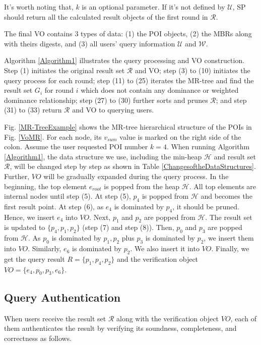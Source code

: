\documentclass[10pt, conference, compsocconf]{IEEEtran}
\begin{document}
It's worth noting that, $k$ is an optional parameter. If it's not defined by $\mathcal{U}$, SP should return all the calculated result objects of the first round in $\mathcal{R}$.

The final VO contains 3 types of data: (1) the POI objects, (2) the MBRs along with theirs digests, and (3) all users' query information $\mathcal{U}$ and $\mathcal{W}$.

Algorithm \ref{Algorithm1} illustrates the query processing and VO construction. Step (1) initiates the original result set $\mathcal{R}$ and VO; step (3) to (10) initiates the query process for each round; step (11) to (25) iterates the MR-tree and find the result set $G_i$ for round $i$ which does not contain any dominance or weighted dominance relationship; step (27) to (30) further sorts and prunes $\mathcal{R}$; and step (31) to (33) return $\mathcal{R}$ and VO to querying users.

Fig. \ref{MR-TreeExample} shows the MR-tree hierarchical structure of the POIs in Fig. \ref{VoMR}. For each node, its $v_{sum}$ value is marked on the right side of the colon. Assume the user requested POI number $k = 4$. When running Algorithm \ref{Algorithm1}, the data structure we use, including the min-heap $\mathcal{H}$ and result set $\mathcal{R}$, will be changed step by step as shown in Table \ref{ChangesoftheDataStructures}. Further, $VO$ will be gradually expanded during the query process. In the beginning, the top element $e_{root}$ is popped from the heap $\mathcal{H}$. All top elements are internal nodes until step (5). At step (5), $p_4$ is popped from $\mathcal{H}$ and becomes the first result point. At step (6), as $e_4$ is dominated by $p_4$, it should be pruned. Hence, we insert $e_4$ into $VO$. Next, $p_1$ and $p_2$ are popped from $\mathcal{H}$. The result set is updated to $\{p_4,p_1,p_2\}$ (step (7) and step (8)). Then, $p_0$ and $p_3$ are popped from $\mathcal{H}$. As $p_0$ is dominated by $p_1, p_2$ plus $p_3$ is dominated by $p_2$, we insert them into $VO$. Similarly, $e_6$ is dominated by $p_2$. We also insert it into $VO$. Finally, we get the query result $R= \{p_1,p_4,p_2\}$ and the verification object $VO = \{e_4,p_0,p_3,e_6\}$.


\subsection{Query Authentication}\label{authentication}

When users receive the result set $\mathcal{R}$ along with the verification object $VO$, each of them authenticates the result by verifying its soundness, completeness, and correctness as follows.
\end{document}
